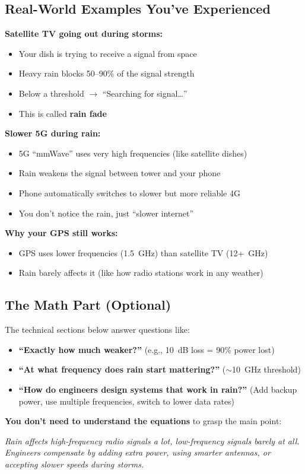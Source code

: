 \begin{nontechnical}
\subsection*{Real-World Examples You've Experienced}

\textbf{Satellite TV going out during storms:}
\begin{itemize}
\item Your dish is trying to receive a signal from space
\item Heavy rain blocks 50--90\% of the signal strength
\item Below a threshold $\rightarrow$ ``Searching for signal\ldots''
\item This is called \textbf{rain fade}
\end{itemize}

\textbf{Slower 5G during rain:}
\begin{itemize}
\item 5G ``mmWave'' uses very high frequencies (like satellite dishes)
\item Rain weakens the signal between tower and your phone
\item Phone automatically switches to slower but more reliable 4G
\item You don't notice the rain, just ``slower internet''
\end{itemize}

\textbf{Why your GPS still works:}
\begin{itemize}
\item GPS uses lower frequencies (1.5~GHz) than satellite TV (12+~GHz)
\item Rain barely affects it (like how radio stations work in any weather)
\end{itemize}

\subsection*{The Math Part (Optional)}

The technical sections below answer questions like:
\begin{itemize}
\item \textbf{``Exactly how much weaker?''} (e.g., 10~dB loss = 90\% power lost)
\item \textbf{``At what frequency does rain start mattering?''} ($\sim$10~GHz threshold)
\item \textbf{``How do engineers design systems that work in rain?''} (Add backup power, use multiple frequencies, switch to lower data rates)
\end{itemize}

\textbf{You don't need to understand the equations} to grasp the main point:

\textit{Rain affects high-frequency radio signals a lot, low-frequency signals barely at all. Engineers compensate by adding extra power, using smarter antennas, or accepting slower speeds during storms.}
\end{nontechnical}

